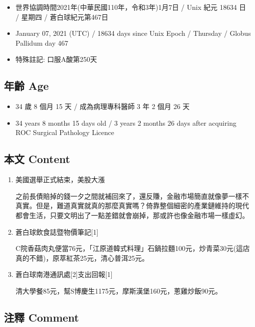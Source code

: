 \documentclass[
]{article}
\providecommand{\tightlist}{%
  \setlength{\itemsep}{0pt}\setlength{\parskip}{0pt}}
\begin{document}
\begin{itemize}
\tightlist
\item
  世界協調時間2021年(中華民國110年，令和3年)1月7日 / Unix 紀元 18634 日
  / 星期四 / 蒼白球紀元第467日
\item
  January 07, 2021 (UTC) / 18634 days since Unix Epoch / Thursday /
  Globus Pallidum day 467
\item
  特殊註記: 口服A酸第250天
\end{itemize}

\hypertarget{ux5e74ux9f61-age-6}{%
\subsection{年齡 Age}\label{ux5e74ux9f61-age-6}}

\begin{itemize}
\tightlist
\item
  34 歲 8 個月 15 天 / 成為病理專科醫師 3 年 2 個月 26 天
\item
  34 years 8 months 15 days old / 3 years 2 months 26 days after
  acquiring ROC Surgical Pathology Licence
\end{itemize}

\hypertarget{ux672cux6587-content-6}{%
\subsection{本文 Content}\label{ux672cux6587-content-6}}

\begin{enumerate}
\def\labelenumi{\arabic{enumi}.}
\item
  美國選舉正式結束，美股大漲

  之前長債賠掉的錢一夕之間就補回來了，還反賺，金融市場簡直就像夢一樣不真實。但是，難道真實就真的那麼真實嗎？倚靠整個細密的產業鏈維持的現代都會生活，只要文明出了一點差錯就會崩掉，那或許也像金融市場一樣虛幻。
\item
  蒼白球飲食誌暨物價筆記{[}1{]}

  C院香菇肉丸便當76元，「江原道韓式料理」石鍋拉麵100元，炒青菜30元(這店真的不錯)，原萃紅茶25元，清心普洱25元。
\item
  蒼白球南港通訊處{[}2{]}支出回報{[}1{]}

  清大學餐85元，幫S博慶生1175元，摩斯漢堡160元，蔥雞炒飯90元。
\end{enumerate}

\hypertarget{ux6ce8ux91cb-comment-6}{%
\subsection{注釋 Comment}\label{ux6ce8ux91cb-comment-6}}
\end{document}
